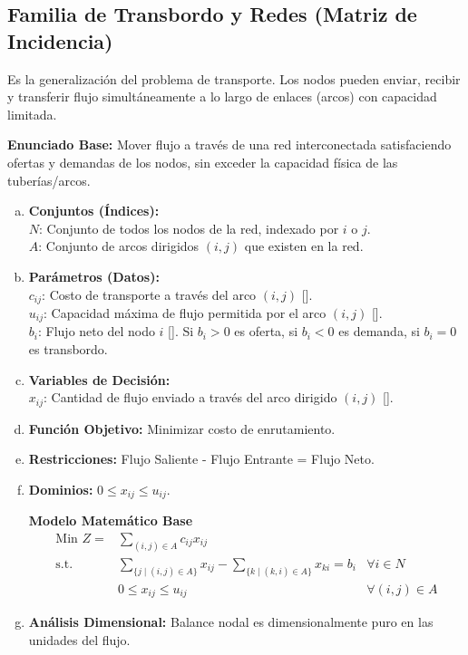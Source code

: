 \documentclass{article}
\begin{document}
	\newpage
	
	\subsection{Familia de Transbordo y Redes (Matriz de Incidencia)}
	Es la generalización del problema de transporte. Los nodos pueden enviar, recibir y transferir flujo simultáneamente a lo largo de enlaces (arcos) con capacidad limitada.
	
	\textbf{Enunciado Base:} Mover flujo a través de una red interconectada satisfaciendo ofertas y demandas de los nodos, sin exceder la capacidad física de las tuberías/arcos.
	
	\begin{enumerate}[a)]
		\item \textbf{Conjuntos (Índices):}\\
		$N$: Conjunto de todos los nodos de la red, indexado por $i$ o $j$.\\
		$A$: Conjunto de arcos dirigidos $(i,j)$ que existen en la red.
		
		\item \textbf{Parámetros (Datos):}\\
		$c_{ij}$: Costo de transporte a través del arco $(i,j)$ [].\\
		$u_{ij}$: Capacidad máxima de flujo permitida por el arco $(i,j)$ [].\\
		$b_i$: Flujo neto del nodo $i$ []. Si $b_i > 0$ es oferta, si $b_i < 0$ es demanda, si $b_i = 0$ es transbordo.
		
		\item \textbf{Variables de Decisión:}\\
		$x_{ij}$: Cantidad de flujo enviado a través del arco dirigido $(i,j)$ [].
		\item \textbf{Función Objetivo:} Minimizar costo de enrutamiento.
		\item \textbf{Restricciones:} Flujo Saliente - Flujo Entrante = Flujo Neto.
		\item \textbf{Dominios:} $0 \leq x_{ij} \leq u_{ij}$.
		
		\begin{center}
			\textbf{Modelo Matemático Base}
			$$\begin{aligned}
				\text{Min } Z = & \sum_{(i,j) \in A} c_{ij} x_{ij} \\
				\text{s.t.} \quad & \sum_{\{j \mid (i,j) \in A\}} x_{ij} - \sum_{\{k \mid (k,i) \in A\}} x_{ki} = b_i & \forall i \in N \\
				& 0 \leq x_{ij} \leq u_{ij} & \forall (i,j) \in A
			\end{aligned}$$
		\end{center}
		
		\item \textbf{Análisis Dimensional:} Balance nodal es dimensionalmente puro en las unidades del flujo.
	\end{enumerate}
	
\end{document}
